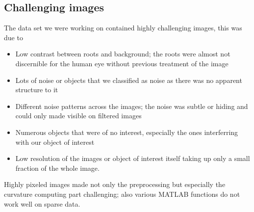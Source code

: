 

\subsection{Challenging images}\label{subsec:challengingImages}

The data set we were working on contained highly challenging images, this was due to
\begin{itemize}
	\item Low contrast between roots and background; the roots were almost not discernible for the human eye without previous treatment of the image
	\item Lots of noise or objects that we classified as noise as there was no apparent structure to it
	\item Different noise patterns across the images; the noise was subtle or hiding and could only made visible on filtered images
	\item Numerous objects that were of no interest, especially the ones interferring with our object of interest
	\item Low resolution of the images or object of interest itself taking up only a small fraction of the whole image. 
\end{itemize}
Highly pixeled images made not only the preprocessing but especially the curvature computing part challenging; also various MATLAB functions do not work well on sparse data.


